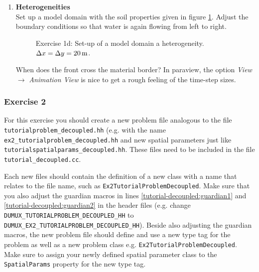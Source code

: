 \begin{enumerate}
\item \textbf{Heterogeneities}  \\
Set up a model domain with the soil properties given in figure \ref{tutorial-deoucpled:exercise1_d}. Adjust the boundary conditions so that water is again flowing from left to right.
\begin{figure}[bt]
\centering
{} 
\caption{Exercise 1d: Set-up of a model domain a heterogeneity. $\Delta x = \Delta y = \unit[20]{m}$.}
\label{tutorial-deoucpled:exercise1_d}
\end{figure}
When does the front cross the material border? In paraview, the option \textit{View} $\rightarrow$ \textit{Animation View} is nice to get a rough feeling of the time-step sizes.
\end{enumerate}

\subsubsection{Exercise 2}
For this exercise you should create a new problem file analogous to
the file \texttt{tutorialproblem\_decoupled.hh} (e.g. with the name 
\texttt{ex2\_tutorialproblem\_decoupled.hh} and new spatial parameters 
just like \texttt{tutorialspatialparams\_decoupled.hh}. These files need to
be included in the file \texttt{tutorial\_decoupled.cc}. 

Each new files should contain the definition of a new class with a 
name that relates to the file name, such as \texttt{Ex2TutorialProblemDecoupled}. 
Make sure that you also adjust the guardian
macros in lines \ref{tutorial-decoupled:guardian1} and \ref{tutorial-decoupled:guardian2}
 in the header files (e.g. change \\
\texttt{DUMUX\_TUTORIALPROBLEM\_DECOUPLED\_HH} to
\texttt{DUMUX\_EX2\_TUTORIALPROBLEM\_DECOUPLED\_HH}).  Beside also adjusting the guardian macros, 
the new problem file should define and use a new type tag for the problem as well as a new problem class
e.g. \texttt{Ex2TutorialProblemDecoupled}. Make sure to assign your newly defined spatial 
parameter class to the \texttt{SpatialParams} property for the new 
type tag. 

